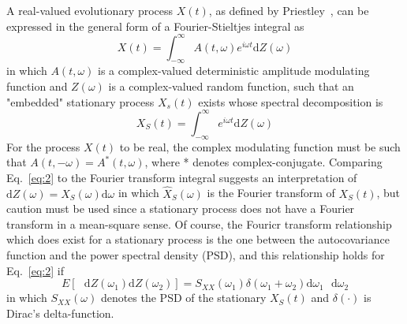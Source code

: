 \documentclass{article}
\newcommand{\cdummy}{\cdot}
\begin{document}
A real-valued evolutionary process $X (t)$, as defined by
Priestley~{\cite{Priestley1965}}, can be expressed in the general form of a
Fourier-Stieltjes integral as
\begin{equation}
  X (t) = \int_{- \infty}^{\infty} A (t, \omega) e^{i \omega t} \mathrm{d} Z
  (\omega) \label{eq:1}
\end{equation}
in which $A (t, \omega)$ is a complex-valued deterministic amplitude
modulating function and $Z (\omega)$ is a complex-valued random function, such
that an "embedded" stationary process $X_s (t)$ exists whose spectral
decomposition is
\begin{equation}
  X_S (t) = \int_{- \infty}^{\infty} e^{i \omega t} \mathrm{d} Z (\omega)
  \label{eq:2}
\end{equation}
For the process $X (t)$ to be real, the complex modulating function must be
such that $A (t, - \omega) = A^{\ast} (t, \omega)$, where * denotes
complex-conjugate. Comparing Eq.~\eqref{eq:2} to the Fourier transform
integral suggests an interpretation of $\mathrm{d} Z (\omega) = \hat{X}_S
(\omega) \mathrm{d} \omega$ in which $\hat{X}_S (\omega)$ is the Fourier
transform of $X_S (t)$, but caution must be used since a stationary process
does not have a Fourier transform in a mean-square sense. Of course, the
Fouricr transform relationship which does exist for a stationary process is
the one between the autocovariance function and the power spectral density
(PSD), and this relationship holds for Eq.~\eqref{eq:2} if
\begin{equation}
  E \left[ \textrm{~ d} Z (\omega_1) \mathrm{d} Z (\omega_2) \right] = S_{XX}
  (\omega_1) \delta (\omega_1 + \omega_2) \mathrm{d} \omega_1 \textrm{~ d}
  \omega_2 \label{eq:3}
\end{equation}
in which $S_{XX} (\omega)$ denotes the PSD of the stationary $X_S (t)$ and
$\delta (\cdummy)$ is Dirac's delta-function.
\end{document}
